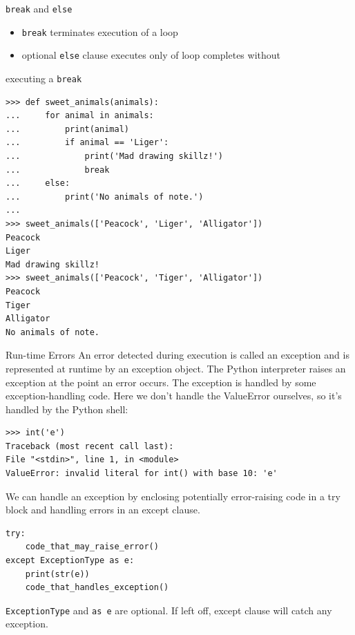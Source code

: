 \documentclass[smaller, aspectratio=1610]{beamer}
\begin{document}
\begin{frame}[label={sec:orgab96520},fragile]{\texttt{break} and \texttt{else}}
 \begin{itemize}
\item \texttt{break} terminates execution of a loop
\item optional \texttt{else} clause executes only of loop completes without
\end{itemize}
executing a \texttt{break}

\lstset{language=Python,label= ,caption= ,captionpos=b,numbers=none}
\begin{lstlisting}
>>> def sweet_animals(animals):
...     for animal in animals:
...         print(animal)
...         if animal == 'Liger':
...             print('Mad drawing skillz!')
...             break
...     else:
...         print('No animals of note.')
...
>>> sweet_animals(['Peacock', 'Liger', 'Alligator'])
Peacock
Liger
Mad drawing skillz!
>>> sweet_animals(['Peacock', 'Tiger', 'Alligator'])
Peacock
Tiger
Alligator
No animals of note.
\end{lstlisting}
\end{frame}

\begin{frame}[label={sec:org12ef2ab},fragile]{Run-time Errors}
 An error detected during execution is called an exception and is represented at runtime by an exception object. The Python interpreter raises an exception at the point an error occurs. The exception is handled by some exception-handling code. Here we don't handle the ValueError ourselves, so it's handled by the Python shell:

\lstset{language=Python,label= ,caption= ,captionpos=b,numbers=none}
\begin{lstlisting}
>>> int('e')
Traceback (most recent call last):
File "<stdin>", line 1, in <module>
ValueError: invalid literal for int() with base 10: 'e'
\end{lstlisting}

We can handle an exception by enclosing potentially error-raising code
in a try block and handling errors in an except clause.

\lstset{language=Python,label= ,caption= ,captionpos=b,numbers=none}
\begin{lstlisting}
try:
    code_that_may_raise_error()
except ExceptionType as e:
    print(str(e))
    code_that_handles_exception()
\end{lstlisting}

\texttt{ExceptionType} and \texttt{as e} are optional. If left off, except clause will catch any
exception.
\end{frame}
\end{document}
